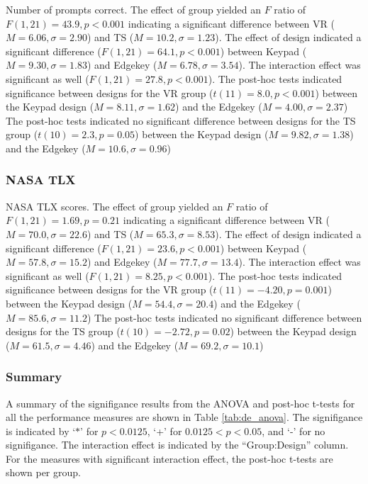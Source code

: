 Number of prompts correct.
The effect of group yielded an $F$ ratio of $F(1, 21) = 43.9, p < 0.001$ indicating a significant difference between VR ($M = 6.06, \sigma = 2.90$) and TS ($M = 10.2, \sigma = 1.23$).
The effect of design indicated a significant difference ($F(1, 21) = 64.1, p < 0.001$) between Keypad ($M = 9.30, \sigma=1.83$) and Edgekey ($M=6.78, \sigma=3.54$).
The interaction effect was significant as well ($F(1, 21) = 27.8, p < 0.001$).
The post-hoc tests indicated significance between designs for the VR group ($t(11) = 8.0, p < 0.001$) between the Keypad design ($M = 8.11, \sigma = 1.62$) and the Edgekey ($M = 4.00, \sigma = 2.37$)
The post-hoc tests indicated no significant difference between designs for the TS group ($t(10) = 2.3, p = 0.05$) between the Keypad design ($M = 9.82, \sigma = 1.38$) and the Edgekey ($M = 10.6, \sigma = 0.96$)

\subsubsection{NASA TLX}

NASA TLX scores.
The effect of group yielded an $F$ ratio of $F(1, 21) = 1.69, p = 0.21$ indicating a significant difference between VR ($M = 70.0, \sigma = 22.6$) and TS ($M = 65.3, \sigma = 8.53$).
The effect of design indicated a significant difference ($F(1, 21) = 23.6, p < 0.001$) between Keypad ($M = 57.8, \sigma=15.2$) and Edgekey ($M=77.7, \sigma=13.4$).
The interaction effect was significant as well ($F(1, 21) = 8.25, p < 0.001$).
The post-hoc tests indicated significance between designs for the VR group ($t(11) = -4.20, p = 0.001$) between the Keypad design ($M = 54.4, \sigma = 20.4$) and the Edgekey ($M = 85.6, \sigma = 11.2$)
The post-hoc tests indicated no significant difference between designs for the TS group ($t(10) = -2.72, p = 0.02$) between the Keypad design ($M = 61.5, \sigma = 4.46$) and the Edgekey ($M = 69.2, \sigma = 10.1$)

\subsubsection{Summary}

A summary of the signifigance results from the ANOVA and post-hoc t-tests for all the performance measures are shown in Table \ref{tab:de_anova}.
The signifigance is indicated by `$*$' for $p<0.0125$, `+' for $0.0125<p<0.05$, and `-' for no signifigance.
The interaction effect is indicated by the ``Group:Design'' column.
For the measures with significant interaction effect, the post-hoc t-tests are shown per group.

